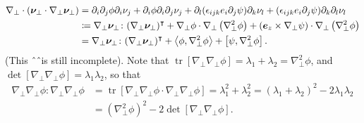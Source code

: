 \documentclass{article}
\newcommand{\lam}{\lambda}
\newcommand{\ep}{\epsilon}
\newcommand{\np}{\nabla_\perp}
\newcommand{\p}{\partial}
\newcommand{\pth} [1] {\left( #1 \right) }
\newcommand{\br} [1] {\left[ #1 \right] }
\begin{document}
\begin{align}
    \np \cdot \pth{\bm{\nu}_\perp \cdot \np \bm{\nu}_\perp} 
    &= \p_i\p_j\phi \p_i\nu_j + \p_i\phi \p_i\p_j\nu_j + \p_l(\ep_{ijk}e_i\p_j\psi)\p_k\nu_l + (\ep_{ijk}e_i\p_j\psi) \p_k\p_l\nu_l \\ 
        &\coloneq \np\bm{\nu}_\perp \colon (\np\bm{\nu}_\perp)^\intercal + \np\phi \cdot \np\pth{\np^2\phi} + \pth{\bm{e}_z \times \np\psi} \cdot \np\pth{\np^2\phi} \\ 
        &= \np\bm{\nu}_\perp \colon (\np\bm{\nu}_\perp)^\intercal + \Braket{\phi, \np^2\phi} + \br{\psi, \np^2\phi}. 
\end{align}
(This \^\ \^\ is still incomplete). Note that $\operatorname{tr}\br{\np\np\phi} = \lam_1 + \lam_2 = \np^2\phi$, and $\operatorname{det}\br{\np\np\phi} = \lam_1\lam_2$, so that 
\begin{align}
    \np\np\phi:\np\np\phi &= \operatorname{tr} \br{\np\np\phi \cdot \np\np\phi} = \lam_1^2 + \lam_2^2 = \pth{\lam_1+\lam_2}^2 - 2\lam_1\lam_2 \\ 
    &= \pth{\np^2\phi}^2 - 2\operatorname{det}\br{\np\np\phi}. 
\end{align}
\end{document}
